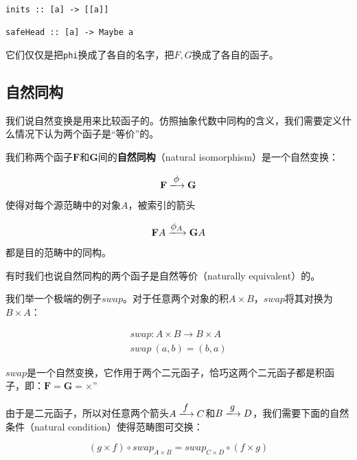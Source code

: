 \documentclass{article}
\begin{document}
\begin{lstlisting}
inits :: [a] -> [[a]]

safeHead :: [a] -> Maybe a
\end{lstlisting}

它们仅仅是把\texttt{phi}换成了各自的名字，把$F, G$换成了各自的函子。

\subsection{自然同构}

我们说自然变换是用来比较函子的。仿照抽象代数中同构的含义，我们需要定义什么情况下认为两个函子是“等价”的。

\begin{definition}
我们称两个函子$\mathbf{F}$和$\mathbf{G}$间的\textbf{自然同构}（natural isomorphism）是一个自然变换：

\[
  \mathbf{F} \arrowto{\phi} \mathbf{G}
\]

使得对每个源范畴中的对象$A$，被索引的箭头

\[
  \mathbf{F}A \arrowto{\phi_A} \mathbf{G}A
\]

都是目的范畴中的同构。
\end{definition}

有时我们也说自然同构的两个函子是自然等价（naturally equivalent）的。

我们举一个极端的例子$swap$。对于任意两个对象的积$A \times B$，$swap$将其对换为$B \times A$：

\[
\begin{array}{l}
swap : A \times B \to B \times A \\
swap\ (a, b) = (b, a)
\end{array}
\]

$swap$是一个自然变换，它作用于两个二元函子，恰巧这两个二元函子都是积函子，即：$\mathbf{F} = \mathbf{G} = \times$”

由于是二元函子，所以对任意两个箭头$A \arrowto{f} C$和$B \arrowto{g} D$，我们需要下面的自然条件（natural condition）使得范畴图可交换：

\[
(g \times f) \circ swap_{A \times B} = swap_{C \times D} \circ (f \times g)
\]

\begin{center}
\end{center}
\end{document}
